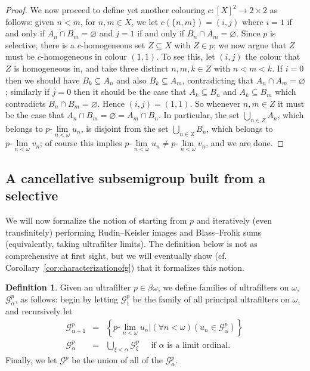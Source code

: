 \documentclass[10pt]{amsart}
\newcommand{\ulim}[2]{#1\text{-}\lim\limits_{#2<\omega}}
\theoremstyle{definition}
\newtheorem{definition}[theorem]{Definition}
\theoremstyle{remark}
\begin{document}
\begin{proof}
We now proceed to define yet another colouring $c:[X]^2\longrightarrow 2\times 2$ as follows: given $n<m$, for $n,m\in X$, we let $c(\{n,m\})=(i,j)$ where $i=1$ if and only if $A_n\cap B_m=\varnothing$ and $j=1$ if and only if $B_n\cap A_m=\varnothing$. Since $p$ is selective, there is a $c$-homogeneous set $Z\subseteq X$ with $Z\in p$; we now argue that $Z$ must be $c$-homogeneous in colour $(1,1)$. To see this, let $(i,j)$ the colour that $Z$ is homogeneous in, and take three distinct $n,m,k\in Z$ with $n<m<k$. If $i=0$ then we should have $B_k\subseteq A_n$ and also $B_k\subseteq A_m$, contradicting that $A_n\cap A_m=\varnothing$; similarly if $j=0$ then it should be the case that $A_k\subseteq B_n$ and $A_k\subseteq B_m$ which contradicts $B_n\cap B_m=\varnothing$. Hence $(i,j)=(1,1)$. So whenever $n,m\in Z$ it must be the case that $A_n\cap B_m=\varnothing=A_m\cap B_n$. In particular, the set $\bigcup_{n\in Z}A_n$, which belongs to $\ulim{p}{n}u_n$, is disjoint from the set  $\bigcup_{n\in Z}B_n$, which belongs to $\ulim{p}{n}v_n$; of course this implies $\ulim{p}{n}u_n\neq\ulim{p}{n}v_n$, and we are done.
\end{proof}

\subsection{A cancellative subsemigroup built from a selective}

We will now formalize the notion of starting from $p$ and iteratively (even transfinitely) performing Rudin--Keisler images and Blass--Frol\'{\i}k sums (equivalently, taking ultrafilter limits). The definition below is not as comprehensive at first sight, but we will eventually show (cf. Corollary~\ref{cor:characterizationofg}) that it formalizes this notion.

\begin{definition}
Given an ultrafilter $p\in\beta\omega$, we define families of ultrafilters on $\omega$, $\mathscr G_\alpha^p$, as follows: begin by letting $\mathscr G_1^p$ be the family of all principal ultrafilters on $\omega$, and recursively let
\begin{eqnarray*}
\mathscr G_{\alpha+1}^p & = & \left\{\ulim{p}{n}u_n\big|(\forall n<\omega)(u_n\in\mathscr G_\alpha^p)\right\}\ \\
\mathscr G_{\alpha}^p & = & \bigcup_{\xi<\alpha}\mathscr G_\xi^p\ \ \ \ \ \text{ if }\alpha\text{ is a limit ordinal.}
\end{eqnarray*}
Finally, we let $\mathscr G^p$ be the union of all of the $\mathscr G_\alpha^p$.
\end{definition}
\end{document}
